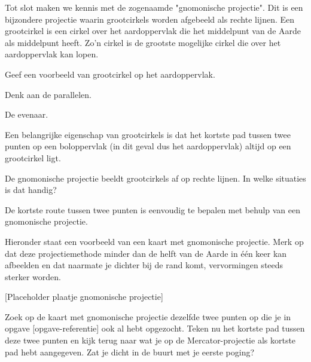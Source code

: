 Tot slot maken we kennis met de zogenaamde "gnomonische projectie". Dit is een bijzondere projectie waarin grootcirkels worden afgebeeld als rechte lijnen. Een grootcirkel is een cirkel over het aardoppervlak die het middelpunt van de Aarde als middelpunt heeft. Zo'n cirkel is de grootste mogelijke cirkel die over het aardoppervlak kan lopen.

\begin{opgave}
	Geef een voorbeeld van grootcirkel op het aardoppervlak.
	\begin{hint}
		Denk aan de parallelen.
	\end{hint}
	\begin{antwoord}
		De evenaar.
	\end{antwoord}
\end{opgave}

Een belangrijke eigenschap van grootcirkels is dat het kortste pad tussen twee punten op een boloppervlak (in dit geval dus het aardoppervlak) altijd op een grootcirkel ligt.

\begin{opgave}
	De gnomonische projectie beeldt grootcirkels af op rechte lijnen. In welke situaties is dat handig?
	\begin{antwoord}
		De kortste route tussen twee punten is eenvoudig te bepalen met behulp van een gnomonische projectie.
	\end{antwoord}
\end{opgave}

Hieronder staat een voorbeeld van een kaart met gnomonische projectie. Merk op dat deze projectiemethode minder dan de helft van de Aarde in \'e\'en keer kan afbeelden en dat naarmate je dichter bij de rand komt, vervormingen steeds sterker worden.

[Placeholder plaatje gnomonische projectie]

\begin{opgave}
	Zoek op de kaart met gnomonische projectie dezelfde twee punten op die je in opgave [opgave-referentie] ook al hebt opgezocht. Teken nu het kortste pad tussen deze twee punten en kijk terug naar wat je op de Mercator-projectie als kortste pad hebt aangegeven. Zat je dicht in de buurt met je eerste poging?
\end{opgave}
